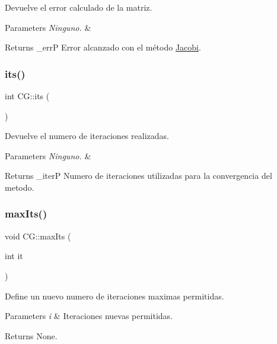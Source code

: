 Devuelve el error calculado de la matriz. 


\begin{DoxyParams}{Parameters}
{\em Ninguno.} & \\
\hline
\end{DoxyParams}
\begin{DoxyReturn}{Returns}
\+\_\+errP Error alcanzado con el método \hyperlink{class_jacobi}{Jacobi}. 
\end{DoxyReturn}
\hypertarget{class_c_g_a3c3895b0d931483af8d62bb80b80173c}{}\label{class_c_g_a3c3895b0d931483af8d62bb80b80173c} 
\subsubsection{\texorpdfstring{its()}{its()}}
{\footnotesize\ttfamily int C\+G\+::its (\begin{DoxyParamCaption}{ }\end{DoxyParamCaption})\hspace{0.3cm}{\ttfamily [inline]}}



Devuelve el numero de iteraciones realizadas. 


\begin{DoxyParams}{Parameters}
{\em Ninguno.} & \\
\hline
\end{DoxyParams}
\begin{DoxyReturn}{Returns}
\+\_\+iterP Numero de iteraciones utilizadas para la convergencia del metodo. 
\end{DoxyReturn}
\hypertarget{class_c_g_aac19c7231dd7771921bbee15ab675b18}{}\label{class_c_g_aac19c7231dd7771921bbee15ab675b18} 
\subsubsection{\texorpdfstring{max\+Its()}{maxIts()}}
{\footnotesize\ttfamily void C\+G\+::max\+Its (\begin{DoxyParamCaption}\item[{int}]{it }\end{DoxyParamCaption})\hspace{0.3cm}{\ttfamily [inline]}}



Define un nuevo numero de iteraciones maximas permitidas. 


\begin{DoxyParams}{Parameters}
{\em i} & Iteraciones nuevas permitidas. \\
\hline
\end{DoxyParams}
\begin{DoxyReturn}{Returns}
None. 
\end{DoxyReturn}
\hypertarget{class_c_g_a48c691b4dc72ceb0afcc21e6d0e85140}{}\label{class_c_g_a48c691b4dc72ceb0afcc21e6d0e85140} 
